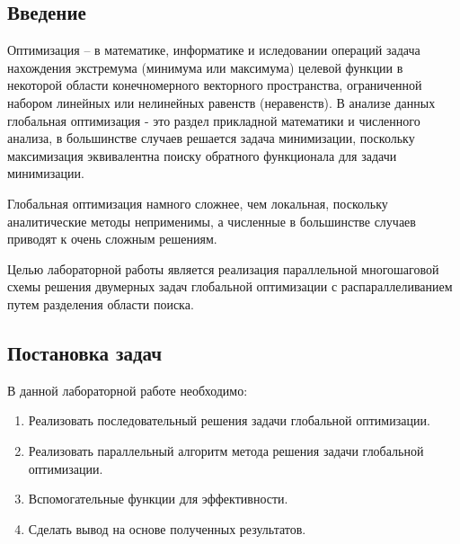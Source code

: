 \documentclass[a4paper]{report}
\begin{document}
\begin{center}
\section*{Введение}
\end{center}
\par Оптимизация -- в математике, информатике и иследовании операций задача нахождения экстремума (минимума или максимума) целевой функции в некоторой области конечномерного векторного пространства, ограниченной набором линейных или нелинейных равенств (неравенств). В анализе данных глобальная оптимизация - это раздел прикладной математики и численного анализа, в большинстве случаев решается задача минимизации, поскольку максимизация эквивалентна поиску обратного функционала для задачи минимизации.
\par Глобальная оптимизация намного сложнее, чем локальная, поскольку аналитические методы неприменимы, а численные в большинстве случаев приводят к очень сложным решениям.
\par Целью лабораторной работы является реализация параллельной многошаговой схемы решения двумерных задач глобальной оптимизации с распараллеливанием путем разделения области поиска. 
\newpage

\begin{center}
\section*{Постановка задач}
\end{center}
В данной лабораторной работе необходимо:
\begin{enumerate}
\item Реализовать последовательный решения задачи глобальной оптимизации.
\item Реализовать параллельный алгоритм метода решения задачи глобальной оптимизации.
\item Вспомогательные функции для эффективности.
\item Сделать вывод на основе полученных результатов.
\end{enumerate}
\newpage
\end{document}
